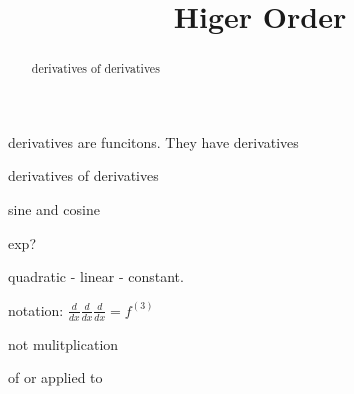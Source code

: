 \documentclass{ximera}
\title{Higer Order}
\begin{document}
\begin{abstract}
  derivatives of derivatives
\end{abstract}
\maketitle



derivatives are funcitons.  They have derivatives

derivatives of derivatives


sine and cosine

exp?


quadratic - linear - constant.




notation:   $\frac{d}{dx} \frac{d}{dx} \frac{d}{dx}  = f^{(3)}$


not mulitplication

of or applied to
\end{document}
